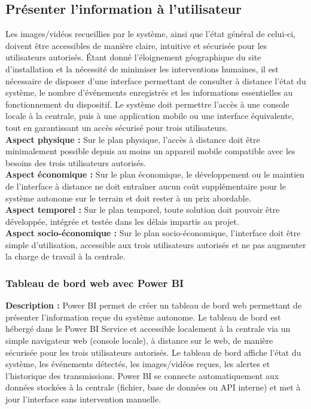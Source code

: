 

\subsection{Présenter l'information à l'utilisateur}

Les images/vidéos recueillies par le système, ainsi que l’état général de
celui-ci, doivent être accessibles de manière claire, intuitive et sécurisée
pour les utilisateurs autorisés. Étant donné l’éloignement géographique du site
d’installation et la nécessité de minimiser les interventions humaines, il est
nécessaire de disposer d’une interface permettant de consulter à distance
l’état du système, le nombre d’événements enregistrés et les informations
essentielles au fonctionnement du dispositif. Le système doit permettre l’accès
à une console locale à la centrale, puis à une application mobile ou une
interface équivalente, tout en garantissant un accès sécurisé pour trois
utilisateurs. \\

\noindent
\textbf{Aspect physique :} Sur le plan physique, l’accès à distance doit
être minimalement possible depuis au moins un appareil mobile compatible avec
les besoins des trois utilisateurs autorisés. \\
\textbf{Aspect économique :} Sur le plan
économique, le développement ou le maintien de l’interface à distance ne doit
entraîner aucun coût supplémentaire pour le système autonome sur le terrain et
doit rester à un prix abordable. \\
\textbf{Aspect temporel :} Sur le plan temporel, toute
solution doit pouvoir être développée, intégrée et testée dans les délais
impartis au projet. \\
\textbf{Aspect socio-économique :} Sur le plan socio-économique,
l’interface doit être simple d’utilisation, accessible aux trois utilisateurs
autorisés et ne pas augmenter la charge de travail à la centrale.

\subsubsection{Tableau de bord web avec Power BI}

\noindent
\textbf{Description :} Power BI permet de créer un tableau de bord web permettant de
présenter l’information reçue du système autonome. Le tableau de bord est
hébergé dans le Power BI Service et accessible localement à la centrale via un
simple navigateur web (console locale), à distance sur le web, de manière
sécurisée pour les trois utilisateurs autorisés. Le tableau de bord affiche
l’état du système, les événements détectés, les images/vidéos reçues, les
alertes et l’historique des transmissions. Power BI se connecte automatiquement
aux données stockées à la centrale (fichier, base de données ou API interne) et
met à jour l’interface sans intervention manuelle. \\

